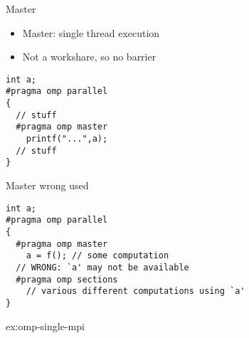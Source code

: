 \begin{numberedframe}{Master}
  \begin{itemize}
  \item Master: single thread execution
  \item Not a workshare, so no barrier
  \end{itemize}
\begin{lstlisting}
int a;
#pragma omp parallel
{
  // stuff
  #pragma omp master
    printf("...",a);
  // stuff
}
\end{lstlisting}
\end{numberedframe}

\begin{numberedframe}{Master wrong used}
\begin{lstlisting}
int a;
#pragma omp parallel
{
  #pragma omp master
    a = f(); // some computation
  // WRONG: `a' may not be available
  #pragma omp sections
    // various different computations using `a'
}
\end{lstlisting}
\end{numberedframe}

\begin{exerciseframe}
   {ex:omp-single-mpi}
\end{exerciseframe}

\endinput

\begin{numberedframe}{}
  \begin{itemize}
  \item 
  \end{itemize}
\end{numberedframe}

\begin{numberedframe}{}
  \begin{itemize}
  \item 
  \end{itemize}
\end{numberedframe}

\begin{numberedframe}{}
  \begin{itemize}
  \item 
  \end{itemize}
\end{numberedframe}

\begin{numberedframe}{}
  \begin{itemize}
  \item 
  \end{itemize}
\end{numberedframe}

\begin{numberedframe}{}
  \begin{itemize}
  \item 
  \end{itemize}
\end{numberedframe}

